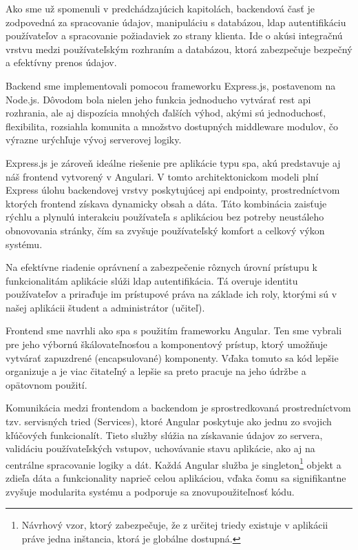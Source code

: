 Ako sme už spomenuli v predchádzajúcich kapitolách, backendová časť je zodpovedná za spracovanie údajov, manipuláciu s databázou, \acrshort{ldap} autentifikáciu používateľov a spracovanie požiadaviek zo strany klienta. Ide o akúsi integračnú vrstvu medzi používateľským rozhraním a databázou, ktorá zabezpečuje bezpečný a efektívny prenos údajov. 

Backend sme implementovali pomocou frameworku Express.js, postavenom na Node.js. Dôvodom bola nielen jeho funkcia jednoducho vytvárať \acrshort{rest} \acrshort{api} rozhrania, ale aj dispozícia mnohých ďalších výhod, akými sú jednoduchosť, flexibilita, rozsiahla komunita a množstvo dostupných middleware modulov, čo výrazne urýchľuje vývoj serverovej logiky.

Express.js je zároveň ideálne riešenie pre aplikácie typu \acrshort{spa}, akú predstavuje aj náš frontend vytvorený v Angulari. V tomto architektonickom modeli plní Express úlohu backendovej vrstvy poskytujúcej \acrshort{api} endpointy, prostredníctvom ktorých frontend získava dynamicky obsah a dáta. Táto kombinácia zaisťuje rýchlu a plynulú interakciu používateľa s aplikáciou bez potreby neustáleho obnovovania stránky, čím sa zvyšuje používateľský komfort a celkový výkon systému.

Na efektívne riadenie oprávnení a zabezpečenie rôznych úrovní prístupu k funkcionalitám aplikácie slúži \acrshort{ldap} autentifikácia. Tá overuje identitu používateľov a priraďuje im prístupové práva na základe ich roly, ktorými sú v našej aplikácii študent a administrátor (učiteľ). 

Frontend sme navrhli ako \acrfull{spa} s použitím frameworku Angular. Ten sme vybrali pre jeho výbornú škálovateľnosťou a komponentový prístup, ktorý umožňuje vytvárať zapuzdrené (encapsulované) komponenty. Vďaka tomuto sa kód lepšie organizuje a je viac čitateľný  a lepšie sa preto pracuje na jeho údržbe a opätovnom použití.

Komunikácia medzi frontendom a backendom je sprostredkovaná prostredníctvom tzv. servisných tried (Services), ktoré Angular poskytuje ako jednu zo svojich kľúčových funkcionalít. Tieto služby slúžia na získavanie údajov zo servera, validáciu používateľských vstupov, uchovávanie stavu aplikácie, ako aj na centrálne spracovanie logiky a dát. Každá Angular služba je singleton\footnote{Návrhový vzor, ktorý zabezpečuje, že z určitej triedy existuje v aplikácii práve jedna inštancia, ktorá je globálne dostupná.} objekt a zdieľa dáta a funkcionality naprieč celou aplikáciou, vďaka čomu sa signifikantne zvyšuje modularita systému a podporuje sa znovupoužiteľnosť kódu.

